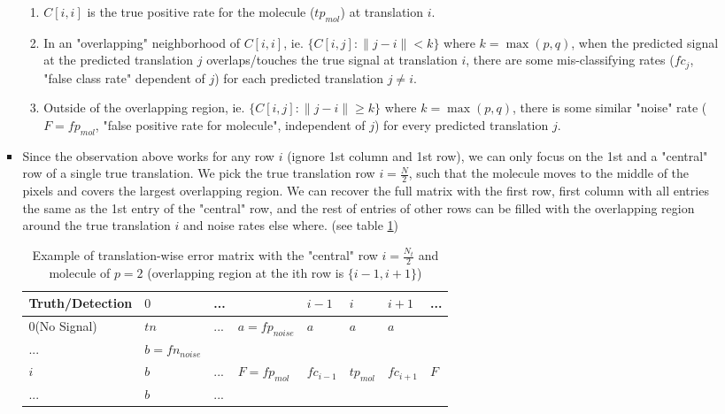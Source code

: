 \documentclass[11pt]{article}
\begin{document}
\begin{itemize}
\begin{enumerate}
\begin{itemize}
                \begin{enumerate}
                    \item $C[i,i]$ is the true positive rate for the molecule ($tp_{mol}$) at translation $i$. 
                    \item In an "overlapping" neighborhood of $C[i,i]$, ie. $\{C[i,j]: \lVert j-i \rVert < k\}$ where $k=\max{(p,q)}$, when the predicted signal at the predicted translation $j$ overlaps/touches the true signal at translation $i$, there are some mis-classifying rates ($fc_{j}$, "false class rate" dependent of $j$) for each predicted translation $j \neq i$.
                    \item Outside of the overlapping region, ie. $\{C[i,j]: \lVert j-i \rVert \ge k\}$ where $k=\max{(p,q)}$, there is some similar "noise" rate ($F=fp_{mol}$, "false positive rate for molecule", independent of $j$) for every predicted translation $j$.
                \end{enumerate}
                \item Since the observation above works for any row $i$ (ignore 1st column and 1st row), we can only focus on the 1st and a "central" row of a single true translation. We pick the true translation row $i=\frac{N}{2}$, such that the molecule moves to the middle of the pixels and covers the largest overlapping region. We can recover the full matrix with the first row, first column with all entries the same as the 1st entry of the "central" row, and the rest of entries of other rows can be filled with the overlapping region around the true translation $i$ and noise rates else where. (see table \ref{table:1})
            \begin {table}
            \centering
            \begin{tabular}{l|l|l|l|l|l|l|l}
            Truth/Detection&$0$&...& &$i-1$&$i$&$i+1$&...\\\hline
            $0$(No Signal)&$tn$&... &$a=fp_{noise}$&$a$&$a$&$a$& \\\hline
            ...&$b=fn_{noise}$& & & & & & \\\hline
            $i$&$b$&...&$F=fp_{mol}$ &$fc_{i-1}$&$tp_{mol}$&$fc_{i+1}$&$F$\\\hline
            ...&$b$&...& & & & & \\\hline
            
            \end{tabular}
            \caption{Example of translation-wise error matrix with the "central" row $i=\frac{N_t}{2}$ and molecule of $p=2$ (overlapping region at the ith row is $\{i-1,i+1\}$)}
            \label{table:1}
            \end{table}
            

\end{itemize}
\end{enumerate}
\end{itemize}
\end{document}
